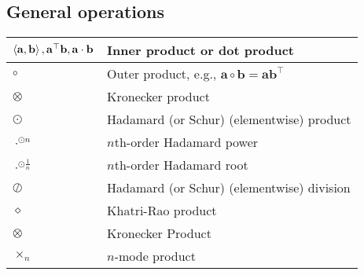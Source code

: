 \documentclass{article}
\begin{document}
\subsection{General operations}
\begin{xltabular}{\textwidth}{XX}
    \(\expval{\mathbf{a}, \mathbf{b}}, \mathbf{a}^\top\mathbf{b}, \mathbf{a}\cdot\mathbf{b}\) & Inner product or dot product\\ \hline
    \(\circ\) & Outer product, e.g., \(\mathbf{a} \circ \mathbf{b} = \mathbf{a}\mathbf{b}^\top\)\\ \hline
    \(\otimes\) & Kronecker product\\ \hline
    \(\odot\) & Hadamard (or Schur) (elementwise) product\\ \hline
    \(\cdot^{\odot n}\) & \(n\)th-order Hadamard power\\ \hline
    \(\cdot^{\odot \frac{1}{n}}\) & \(n\)th-order Hadamard root\\ \hline
    \(\oslash\) & Hadamard (or Schur) (elementwise) division\\ \hline
    \(\diamond\) & Khatri-Rao product\\ \hline
    \(\otimes\) & Kronecker Product\\ \hline
    \(\times_n\) & \(n\)-mode product\\
\end{xltabular}
\end{document}
